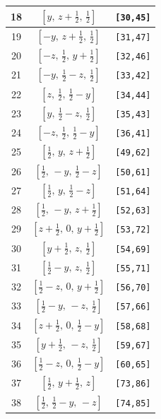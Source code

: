 \documentclass[fleqn,8pt]{jsarticle}
\begin{document}
\begin{longtable}{ccc}
18 & $\left[ y,\, z + \frac{1}{2},\, \frac{1}{2} \right]$ & {\tt [30,45]} \\ \hline
19 & $\left[ - y,\, z + \frac{1}{2},\, \frac{1}{2} \right]$ & {\tt [31,47]} \\ \hline
20 & $\left[ - z,\, \frac{1}{2},\, y + \frac{1}{2} \right]$ & {\tt [32,46]} \\ \hline
21 & $\left[ - y,\, \frac{1}{2} - z,\, \frac{1}{2} \right]$ & {\tt [33,42]} \\ \hline
22 & $\left[ z,\, \frac{1}{2},\, \frac{1}{2} - y \right]$ & {\tt [34,44]} \\ \hline
23 & $\left[ y,\, \frac{1}{2} - z,\, \frac{1}{2} \right]$ & {\tt [35,43]} \\ \hline
24 & $\left[ - z,\, \frac{1}{2},\, \frac{1}{2} - y \right]$ & {\tt [36,41]} \\ \hline
25 & $\left[ \frac{1}{2},\, y,\, z + \frac{1}{2} \right]$ & {\tt [49,62]} \\ \hline
26 & $\left[ \frac{1}{2},\, - y,\, \frac{1}{2} - z \right]$ & {\tt [50,61]} \\ \hline
27 & $\left[ \frac{1}{2},\, y,\, \frac{1}{2} - z \right]$ & {\tt [51,64]} \\ \hline
28 & $\left[ \frac{1}{2},\, - y,\, z + \frac{1}{2} \right]$ & {\tt [52,63]} \\ \hline
29 & $\left[ z + \frac{1}{2},\, 0,\, y + \frac{1}{2} \right]$ & {\tt [53,72]} \\ \hline
30 & $\left[ y + \frac{1}{2},\, z,\, \frac{1}{2} \right]$ & {\tt [54,69]} \\ \hline
31 & $\left[ \frac{1}{2} - y,\, z,\, \frac{1}{2} \right]$ & {\tt [55,71]} \\ \hline
32 & $\left[ \frac{1}{2} - z,\, 0,\, y + \frac{1}{2} \right]$ & {\tt [56,70]} \\ \hline
33 & $\left[ \frac{1}{2} - y,\, - z,\, \frac{1}{2} \right]$ & {\tt [57,66]} \\ \hline
34 & $\left[ z + \frac{1}{2},\, 0,\, \frac{1}{2} - y \right]$ & {\tt [58,68]} \\ \hline
35 & $\left[ y + \frac{1}{2},\, - z,\, \frac{1}{2} \right]$ & {\tt [59,67]} \\ \hline
36 & $\left[ \frac{1}{2} - z,\, 0,\, \frac{1}{2} - y \right]$ & {\tt [60,65]} \\ \hline
37 & $\left[ \frac{1}{2},\, y + \frac{1}{2},\, z \right]$ & {\tt [73,86]} \\ \hline
38 & $\left[ \frac{1}{2},\, \frac{1}{2} - y,\, - z \right]$ & {\tt [74,85]} \\ \hline

\end{longtable}
\end{document}
